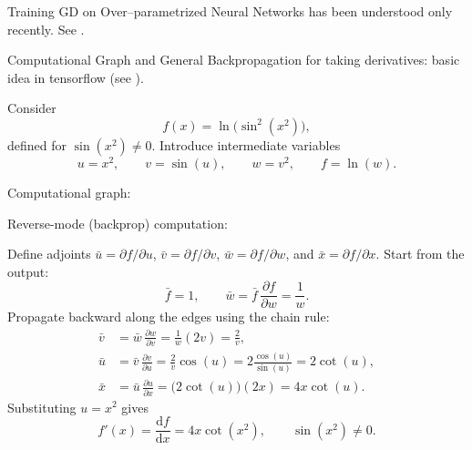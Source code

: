 Training GD on Over--parametrized Neural Networks has been understood only recently.
See \cite{Zhang2018ReLU, Du2018OverparamGD, AllenZhu2018Convergence, Du2018GlobalMin}.

Computational Graph and General Backpropagation for taking derivatives: basic idea in tensorflow (see \cite{TensorflowAutodiff}). 

 Consider
\[
 f(x)=\ln\bigl(\sin^2(x^2)\bigr),
\]
defined for $\sin(x^2)\neq 0$. Introduce intermediate variables
\begin{equation}
 u=x^2,\qquad v=\sin(u),\qquad w=v^2,\qquad f=\ln(w).
 \label{eq:forward-defs}
\end{equation}

Computational graph:

\begin{center}
\end{center}

Reverse-mode (backprop) computation:

Define adjoints $\bar{u}=\partial f/\partial u$, $\bar{v}=\partial f/\partial v$,
$\bar{w}=\partial f/\partial w$, and $\bar{x}=\partial f/\partial x$.
Start from the output:
\[
\bar{f}=1,\qquad \bar{w}=\bar{f}\,\frac{\partial f}{\partial w}=\frac{1}{w}.
\]
Propagate backward along the edges using the chain rule:
\begin{align*}
\bar{v} &= \bar{w}\,\frac{\partial w}{\partial v}=\frac{1}{w}(2v)=\frac{2}{v},\\
\bar{u} &= \bar{v}\,\frac{\partial v}{\partial u}=\frac{2}{v}\cos(u)
        =2\frac{\cos(u)}{\sin(u)}=2\cot(u),\\
\bar{x} &= \bar{u}\,\frac{\partial u}{\partial x}=\bigl(2\cot(u)\bigr)(2x)=4x\cot(u).
\end{align*}
Substituting $u=x^2$ gives
\begin{equation}
 f'(x)=\frac{\mathrm d f}{\mathrm d x}=4x\cot(x^2), \qquad \sin(x^2)\neq 0.
\end{equation}

